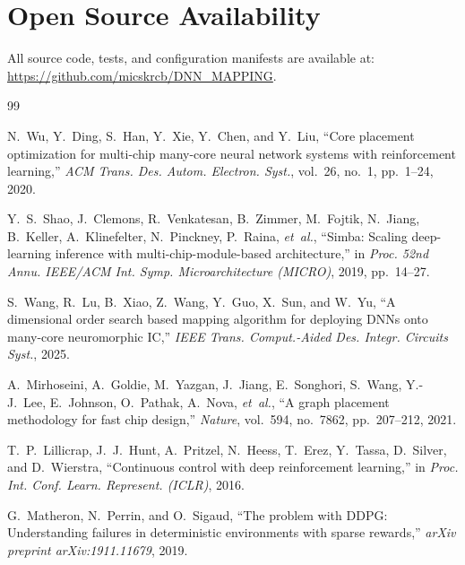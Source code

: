 \documentclass[10pt,conference]{IEEEtran}
\begin{document}
\section{Open Source Availability}
All source code, tests, and configuration manifests are available at: \\
\url{https://github.com/micskrcb/DNN_MAPPING}.


\begin{thebibliography}{99}

N.~Wu, Y.~Ding, S.~Han, Y.~Xie, Y.~Chen, and Y.~Liu,
``Core placement optimization for multi-chip many-core neural network systems with reinforcement learning,''
\emph{ACM Trans. Des. Autom. Electron. Syst.}, vol.~26, no.~1, pp.~1--24, 2020.

Y.~S.~Shao, J.~Clemons, R.~Venkatesan, B.~Zimmer, M.~Fojtik, N.~Jiang, B.~Keller, A.~Klinefelter, N.~Pinckney, P.~Raina, \emph{et~al.},
``Simba: Scaling deep-learning inference with multi-chip-module-based architecture,''
in \emph{Proc. 52nd Annu. IEEE/ACM Int. Symp. Microarchitecture (MICRO)}, 2019, pp.~14--27.

S.~Wang, R.~Lu, B.~Xiao, Z.~Wang, Y.~Guo, X.~Sun, and W.~Yu,
``A dimensional order search based mapping algorithm for deploying {DNN}s onto many-core neuromorphic {IC},''
\emph{IEEE Trans. Comput.-Aided Des. Integr. Circuits Syst.}, 2025.

A.~Mirhoseini, A.~Goldie, M.~Yazgan, J.~Jiang, E.~Songhori, S.~Wang, Y.-J.~Lee, E.~Johnson, O.~Pathak, A.~Nova, \emph{et~al.},
``A graph placement methodology for fast chip design,''
\emph{Nature}, vol.~594, no.~7862, pp.~207--212, 2021.

T.~P.~Lillicrap, J.~J.~Hunt, A.~Pritzel, N.~Heess, T.~Erez, Y.~Tassa, D.~Silver, and D.~Wierstra,
``Continuous control with deep reinforcement learning,''
in \emph{Proc. Int. Conf. Learn. Represent. (ICLR)}, 2016.

G.~Matheron, N.~Perrin, and O.~Sigaud,
``The problem with {DDPG}: Understanding failures in deterministic environments with sparse rewards,''
\emph{arXiv preprint arXiv:1911.11679}, 2019.


\end{thebibliography}
\end{document}
